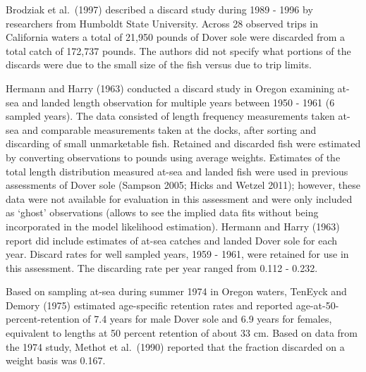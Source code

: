 \documentclass[11pt,
  english,
  a4paper,
]{article}
\begin{document}

Brodziak et al.~{(1997)\leavevmode\tagmcend\tagstructend} described a discard study during 1989 - 1996 by researchers from Humboldt State University. Across 28 observed trips in California waters a total of 21,950 pounds of Dover sole were discarded from a total catch of 172,737 pounds. The authors did not specify what portions of the discards were due to the small size of the fish versus due to trip limits.

\leavevmode\tagmcend\tagstructend\par


Hermann and Harry {(1963)\leavevmode\tagmcend\tagstructend} conducted a discard study in Oregon examining at-sea and landed length observation for multiple years between 1950 - 1961 (6 sampled years). The data consisted of length frequency measurements taken at-sea and comparable measurements taken at the docks, after sorting and discarding of small unmarketable fish. Retained and discarded fish were estimated by converting observations to pounds using average weights. Estimates of the total length distribution measured at-sea and landed fish were used in previous assessments of Dover sole {(Sampson 2005; Hicks and Wetzel 2011)\leavevmode\tagmcend\tagstructend}; however, these data were not available for evaluation in this assessment and were only included as `ghost' observations (allows to see the implied data fits without being incorporated in the model likelihood estimation). Hermann and Harry {(1963)\leavevmode\tagmcend\tagstructend} report did include estimates of at-sea catches and landed Dover sole for each year. Discard rates for well sampled years, 1959 - 1961, were retained for use in this assessment. The discarding rate per year ranged from 0.112 - 0.232.

\leavevmode\tagmcend\tagstructend\par


Based on sampling at-sea during summer 1974 in Oregon waters, TenEyck and Demory {(1975)\leavevmode\tagmcend\tagstructend} estimated age-specific retention rates and reported age-at-50-percent-retention of 7.4 years for male Dover sole and 6.9 years for females, equivalent to lengths at 50 percent retention of about 33 cm. Based on data from the 1974 study, Methot et al.~{(1990)\leavevmode\tagmcend\tagstructend} reported that the fraction discarded on a weight basis was 0.167.
\end{document}
